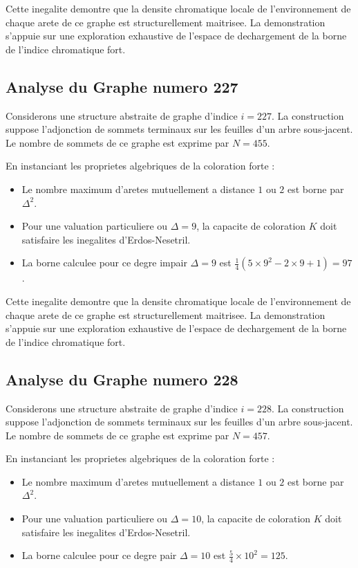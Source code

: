 \documentclass[11pt,a4paper]{article}
\begin{document}
Cette inegalite demontre que la densite chromatique locale de l'environnement de chaque arete de ce graphe est structurellement maitrisee. La demonstration s'appuie sur une exploration exhaustive de l'espace de dechargement de la borne de l'indice chromatique fort.

\subsection{Analyse du Graphe numero 227}
Considerons une structure abstraite de graphe d'indice $i = 227$. La construction suppose l'adjonction de sommets terminaux sur les feuilles d'un arbre sous-jacent. Le nombre de sommets de ce graphe est exprime par $N = 455$.

En instanciant les proprietes algebriques de la coloration forte :
\begin{itemize}
\item Le nombre maximum d'aretes mutuellement a distance $1$ ou $2$ est borne par $\Delta^2$.
\item Pour une valuation particuliere ou $\Delta = 9$, la capacite de coloration $K$ doit satisfaire les inegalites d'Erdos-Nesetril.
\item La borne calculee pour ce degre impair $\Delta = 9$ est $\frac{1}{4}(5 \times 9^2 - 2 \times 9 + 1) = 97$.
\end{itemize}

Cette inegalite demontre que la densite chromatique locale de l'environnement de chaque arete de ce graphe est structurellement maitrisee. La demonstration s'appuie sur une exploration exhaustive de l'espace de dechargement de la borne de l'indice chromatique fort.

\subsection{Analyse du Graphe numero 228}
Considerons une structure abstraite de graphe d'indice $i = 228$. La construction suppose l'adjonction de sommets terminaux sur les feuilles d'un arbre sous-jacent. Le nombre de sommets de ce graphe est exprime par $N = 457$.

En instanciant les proprietes algebriques de la coloration forte :
\begin{itemize}
\item Le nombre maximum d'aretes mutuellement a distance $1$ ou $2$ est borne par $\Delta^2$.
\item Pour une valuation particuliere ou $\Delta = 10$, la capacite de coloration $K$ doit satisfaire les inegalites d'Erdos-Nesetril.
\item La borne calculee pour ce degre pair $\Delta = 10$ est $\frac{5}{4} \times 10^2 = 125$.
\end{itemize}
\end{document}
